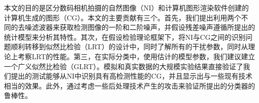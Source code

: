 
\begin{cabstract}
本文的目的是区分数码相机拍摄的自然图像（NI）和计算机图形渲染软件创建的计算机生成的图形（CG）。本文的主要贡献有三个。首先，我们提出利用两个不同的去噪滤波器来获取检测图像的一阶和二阶噪声，并假设残差噪声遵循所提出的统计模型来分析其特性。其次，在假设检验理论框架下，将NI与CG之间的识别问题顺利转移到似然比检验（LRT）的设计中，同时了解所有的干扰参数，同时从理论上考察LRT的性能。第三，在实际分类中，使用估计的模型参数，我们建议建立一个广义似然比检验（GLRT）。模拟和真实数据的大规模实验结果直接验证了我们提出的测试能够从NI中识别具有高检测性能的CG，并且显示出与一些现有技术相当的效果。此外，通过考虑一些后处理技术产生的攻击来验证所提出的分类器的鲁棒性。

\end{cabstract}

